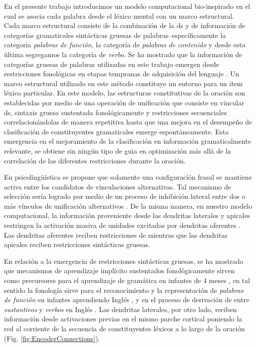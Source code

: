 {En el presente trabajo introducimos un modelo computacional bio-inspirado en el cual se asocia cada palabra desde el léxico mental con un marco estructural.
Cada marco estructural consiste de la combinación de la \gls{ds} \cite{doi:10.1080/00437956.1954.11659520} y de
información de categorías gramaticales sintácticas gruesas de palabras--específicamente la categoría \emph{palabras de función}, la categoría de \emph{palabras de contenido} y desde esta última segregamos la categoría de \emph{verbo}.
Se ha mostrado que la información de categorías gruesas de palabras utilizadas en este trabajo emergen desde restricciones fonológicas en etapas tempranas de adquisición del lenguaje \cite{doi:10.1207/s15327078in1002_5,lohmann_phonological_2017}.
Un marco estructural utilizado en este método constituye un  entorno para un item léxico particular.
En este modelo, las estructuras constitutivas de la oración son establecidas por medio de una operación de unificación que consiste en vincular \gls{ds},
sintaxis gruesa sustentada fonológicamente y restricciones secuenciales correlacionándolas de manera repetitiva hasta que una mejora en el desempeño de clasificación de constituyentes gramaticales emerge espontáneamente.
Esta emergencia en el mejoramiento de la clasificación en información gramaticalmente relevante, se obtiene sin ningún tipo de guia en optimización más allá de la correlación de las diferentes restricciones durante la oración.

En psicolingüística se propone que solamente una configuración frasal se mantiene activa entre los candidatos de vinculaciones alternativas.
Tal mecanismo de selección sería logrado por medio de un proceso de inhibición lateral entre dos o más vínculos de unificación alternativos \cite{Hagoort2005OnBB}.
De la misma manera, en nuestro modelo computacional, la información proveniente desde las dendritas laterales y apicales restringen la activación masiva de unidades excitadas por dendritas aferentes \cite{10.1371/journal.pone.0217966}.
Las dendritas aferentes reciben restricciones de  mientras que las dendritas apicales reciben restricciones sintácticas gruesas.

En relación a la emergencia de restricciones sintácticas gruesas, se ha mostrado que mecanismos de aprendizaje implícito sustentados fonológicamente sirven como precursores para el aprendizaje de gramática en infantes de 4 meses \cite{10.1371/journal.pone.0017920}, en tal sentido la fonología sirve para el reconocimiento y la representación de \emph{palabras de función} en infantes aprendiendo Inglés \cite{doi:10.1207/s15327078in1002_5}, y en el proceso de derivación de entre \emph{sustantivos} y \emph{verbos} en Inglés \cite{lohmann_phonological_2017}.
Las dendritas laterales, por otro lado, reciben información desde activaciones previas en el mismo parche cortical poniendo la red al corriente de la secuencia de constituyentes léxicos a lo largo de la oración (Fig. \ref{fig:EncoderConnections}).

}
